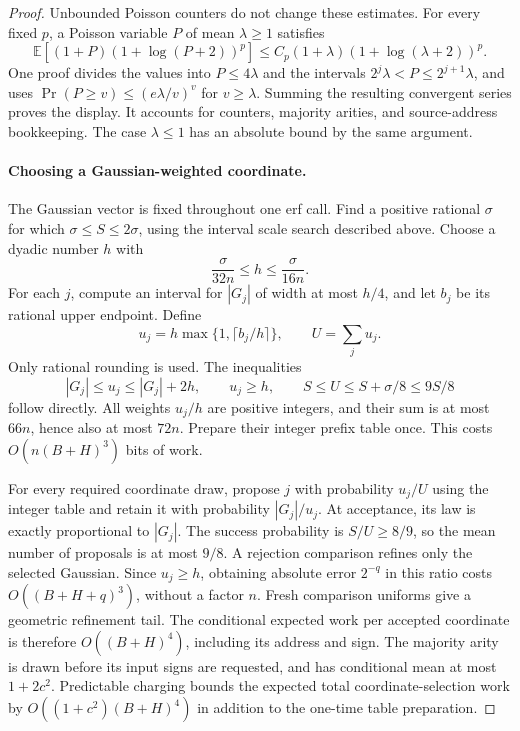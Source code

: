 \begin{proof}
Unbounded Poisson counters do not change these estimates. For every
fixed $p$, a Poisson variable $P$ of mean $\lambda\ge1$ satisfies
\[
 \mathbb E[(1+P)(1+\log(P+2))^p]
 \le C_p(1+\lambda)(1+\log(\lambda+2))^p.
\]
One proof divides the values into $P\le4\lambda$ and the intervals
$2^j\lambda<P\le2^{j+1}\lambda$, and uses
$\Pr(P\ge v)\le(e\lambda/v)^v$ for $v\ge\lambda$. Summing the
resulting convergent series proves the display. It accounts for
counters, majority arities, and source-address bookkeeping. The case
$\lambda\le1$ has an absolute bound by the same argument.

\paragraph{Choosing a Gaussian-weighted coordinate.}
The Gaussian vector is fixed throughout one erf call. Find a positive
rational $\sigma$ for which $\sigma\le S\le2\sigma$, using the interval
scale search described above. Choose a dyadic number $h$ with
\[
 \frac{\sigma}{32n}\le h\le\frac{\sigma}{16n}.
\]
For each $j$, compute an interval for $|G_j|$ of width at most $h/4$,
and let $b_j$ be its rational upper endpoint. Define
\[
 u_j=h\max\{1,\lceil b_j/h\rceil\},\qquad U=\sum_j u_j.
\]
Only rational rounding is used. The inequalities
\[
 |G_j|\le u_j\le |G_j|+2h,\qquad u_j\ge h,
 \qquad S\le U\le S+\sigma/8\le9S/8
\]
follow directly. All weights $u_j/h$ are positive integers, and their
sum is at most $66n$, hence also at most $72n$. Prepare their integer
prefix table once. This costs $O(n(B+H)^3)$ bits of work.

For every required coordinate draw, propose $j$ with probability $u_j/U$
using the integer table and retain it with probability $|G_j|/u_j$.
At acceptance, its law is exactly proportional to $|G_j|$. The success
probability is $S/U\ge8/9$, so the mean number of proposals is at most
$9/8$. A rejection comparison refines only the selected Gaussian.
Since $u_j\ge h$, obtaining absolute error $2^{-q}$ in this ratio costs
$O((B+H+q)^3)$, without a factor $n$. Fresh comparison uniforms give a
geometric refinement tail. The conditional expected work per accepted
coordinate is therefore $O((B+H)^4)$, including its address and sign.
The majority arity is drawn before its input signs are requested, and
has conditional mean at most $1+2c^2$. Predictable charging bounds the
expected total coordinate-selection work by
$O((1+c^2)(B+H)^4)$ in addition to the one-time table preparation.


\end{proof}
